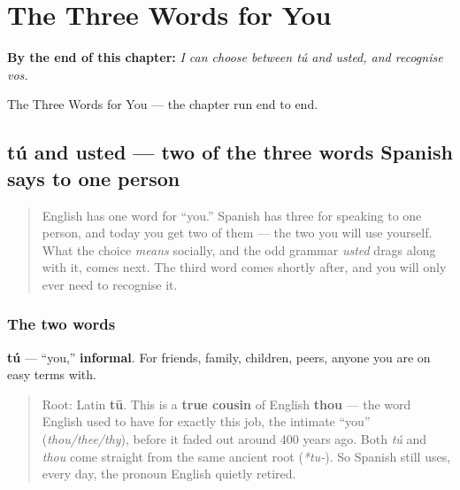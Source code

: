 
\chapter{The Three Words for You}
\label{ch:three-yous}

\begin{chapteropening}
\textbf{By the end of this chapter:} \emph{I can choose between tú and usted, and recognise vos.}

The Three Words for You — the chapter run end to end.
\end{chapteropening}

\section[tú / usted]{tú and usted — two of the three words Spanish says to one person}

\label{lesson:ES-C03-tu-usted}



\begin{quote}
English has one word for \textquotedblleft{}you.\textquotedblright{} Spanish has three for speaking to one person, and today you get two of them — the two you will use yourself. What the choice \emph{means} socially, and the odd grammar \emph{usted} drags along with it, comes next. The third word comes shortly after, and you will only ever need to recognise it.
\end{quote}

\subsection*{The two words}
\textbf{tú} — \textquotedblleft{}you,\textquotedblright{} \textbf{informal}. For friends, family, children, peers, anyone you are on easy terms with.

\begin{quote}
Root: Latin \textbf{tū}. This is a \textbf{true cousin} of English \textbf{thou} — the word English used to have for exactly this job, the intimate \textquotedblleft{}you\textquotedblright{} (\emph{thou/thee/thy}), before it faded out around 400 years ago. Both \emph{tú} and \emph{thou} come straight from the same ancient root (\emph{*tu-}). So Spanish still uses, every day, the pronoun English quietly retired.
\end{quote}

